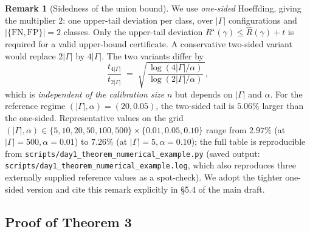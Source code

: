 \documentclass[11pt]{article}
\theoremstyle{plain}
\theoremstyle{definition}
\newtheorem{remark}{Remark}
\begin{document}
\begin{remark}[Sidedness of the union bound]\label{rem:thm3-sidedness}
We use \emph{one-sided} Hoeffding, giving the multiplier $2$: one upper-tail deviation per class, over $|\Gamma|$ configurations and $|\{\mathrm{FN}, \mathrm{FP}\}| = 2$ classes. Only the upper-tail deviation $R^{\star}(\gamma) \le \widehat R(\gamma) + t$ is required for a valid upper-bound certificate. A conservative two-sided variant would replace $2|\Gamma|$ by $4|\Gamma|$. The two variants differ by
\[
\frac{t_{4|\Gamma|}}{t_{2|\Gamma|}} \;=\; \sqrt{\,\frac{\log(4|\Gamma|/\alpha)}{\log(2|\Gamma|/\alpha)}\,},
\]
which is \emph{independent of the calibration size} $n$ but depends on $|\Gamma|$ and $\alpha$.
For the reference regime $(|\Gamma|, \alpha) = (20, 0.05)$, the two-sided tail is $5.06\%$ larger than the one-sided.
Representative values on the grid $(|\Gamma|, \alpha) \in \{5, 10, 20, 50, 100, 500\} \times \{0.01, 0.05, 0.10\}$
range from $2.97\%$ (at $|\Gamma|=500, \alpha=0.01$) to $7.26\%$ (at $|\Gamma|=5, \alpha=0.10$);
the full table is reproducible from \texttt{scripts/day1\_theorem\_numerical\_example.py}
(saved output: \texttt{scripts/day1\_theorem\_numerical\_example.log}, which also reproduces three externally supplied reference values as a spot-check).
We adopt the tighter one-sided version and cite this remark explicitly in \S 5.4 of the main draft.
\end{remark}

\subsection{Proof of Theorem 3}
\end{document}
